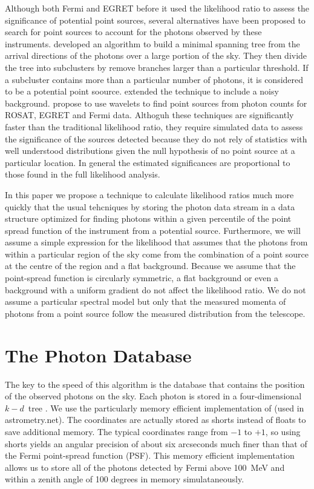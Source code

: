 \documentclass[useAMS,usenatbib]{mn2e}
\begin{document}
Although both Fermi and EGRET before it used the likelihood ratio to
assess the significance of potential point sources, several
alternatives have been proposed to search for point sources to account
for the photons observed by these instruments.
\citet{2009arXiv0912.3843M,2008MNRAS.383.1166C} developed an algorithm
to build a minimal spanning tree from the arrival directions of the
photons over a large portion of the sky.  They then divide the tree
into subclusters by remove branches larger than a particular
threshold.  If a subcluster contains more than a particular number of
photons, it is considered to be a potential point soource.
\citet{2013Ap&SS.347..169C} extended the technique to include a noisy
background.
\citet{1997ApJ...483..350D,1997ApJ...483..370D,2007AIPC..921..546C}
propose to use wavelets to find point sources from photon counts for
ROSAT, EGRET and Fermi data.  Althoguh these techniques are
significantly faster than the traditional likelihood ratio, they
require simulated data to assess the significance of the sources
detected because they do not rely of statistics with well understood
distributions given the null hypothesis of no point source at a
particular location.  In general the estimated significances are
proportional to those found in the full likelihood analysis.

In this paper we propose a technique to calculate likelihood ratios
much more quickly that the usual tehcniques by storing the photon data
stream in a data structure optimized for finding photons within a
given percentile of the point spread function of the instrument from a
potential source.  Furthermore, we will assume a simple expression for
the likelihood that assumes that the photons from within a particular
region of the sky come from the combination of a point source at the
centre of the region and a flat background.  Because we assume that
the point-spread function is circularly symmetric, a flat background
or even a background with a uniform gradient do not affect the
likelihood ratio. We do not assume a particular spectral model but
only that the measured momenta of photons from a point source follow
the measured distribution \citep{2013ApJ...765...54A} from the
telescope.

\section{The Photon Database}
\label{sec:photon-database}

The key to the speed of this algorithm is the database that contains
the position of the observed photons on the sky.  Each photon is
stored in a four-dimensional $k-d$~tree
\citep{Bentley:1975:MBS:361002.361007}.  We use the particularly
memory efficient implementation of \citet{LangPhD} (used in
astrometry.net).  The coordinates are actually stored as shorts
instead of floats to save additional memory.  The typical coordinates
range from $-1$ to $+1$, so using shorts yields an angular precision
of about six arcseconds much finer than that of the Fermi point-spread
function (PSF).  This memory efficient implementation allows us to
store all of the photons detected by Fermi above 100~MeV and within a
zenith angle of 100 degrees in memory simulataneously.
\end{document}
